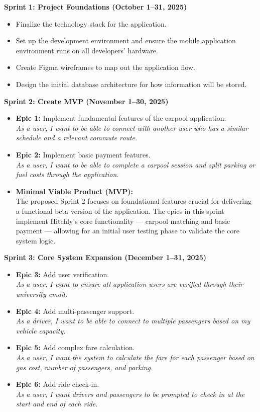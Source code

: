 \documentclass[12pt,letterpaper]{article}
\begin{document}
\textbf{Sprint 1: Project Foundations (October 1--31, 2025)}
\begin{itemize}
    \item Finalize the technology stack for the application.
    \item Set up the development environment and ensure the mobile application environment runs on all developers’ hardware.
    \item Create Figma wireframes to map out the application flow.
    \item Design the initial database architecture for how information will be stored.
\end{itemize}

\textbf{Sprint 2: Create MVP (November 1--30, 2025)}
\begin{itemize}
    \item \textbf{Epic 1:} Implement fundamental features of the carpool application. \\
    \textit{As a user, I want to be able to connect with another user who has a similar schedule and a relevant commute route.}
    
    \item \textbf{Epic 2:} Implement basic payment features. \\
    \textit{As a user, I want to be able to complete a carpool session and split parking or fuel costs through the application.}
    
    \item \textbf{Minimal Viable Product (MVP):} \\
    The proposed Sprint 2 focuses on foundational features crucial for delivering a functional beta version of the application. The epics in this sprint implement Hitchly’s core functionality — carpool matching and basic payment — allowing for an initial user testing phase to validate the core system logic.
\end{itemize}

\textbf{Sprint 3: Core System Expansion (December 1--31, 2025)}
\begin{itemize}
    \item \textbf{Epic 3:} Add user verification. \\
    \textit{As a user, I want to ensure all application users are verified through their university email.}

    \item \textbf{Epic 4:} Add multi-passenger support. \\
    \textit{As a driver, I want to be able to connect to multiple passengers based on my vehicle capacity.}

    \item \textbf{Epic 5:} Add complex fare calculation. \\
    \textit{As a user, I want the system to calculate the fare for each passenger based on gas cost, number of passengers, and parking.}

    \item \textbf{Epic 6:} Add ride check-in. \\
    \textit{As a user, I want drivers and passengers to be prompted to check in at the start and end of each ride.}
\end{itemize}
\end{document}

